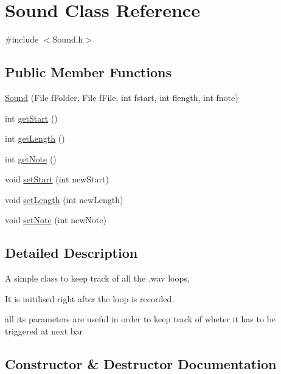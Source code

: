 \hypertarget{class_sound}{}\section{Sound Class Reference}
\label{class_sound}


{\ttfamily \#include $<$Sound.\+h$>$}

\subsection*{Public Member Functions}
\begin{DoxyCompactItemize}
\item 
\mbox{\hyperlink{class_sound_afd2f45e3e3beff9624ae5fb02fbc80bb}{Sound}} (File f\+Folder, File f\+File, int fstart, int flength, int fnote)
\item 
int \mbox{\hyperlink{class_sound_abdc20b1e2d151987ad6958749693a622}{get\+Start}} ()
\item 
int \mbox{\hyperlink{class_sound_a621ec3a749962543eea4d64a789b38b4}{get\+Length}} ()
\item 
int \mbox{\hyperlink{class_sound_a13c91185d1fd706bccb1ee4eb1b36645}{get\+Note}} ()
\item 
void \mbox{\hyperlink{class_sound_a461046367f146bb9e842a3ac36e144a3}{set\+Start}} (int new\+Start)
\item 
void \mbox{\hyperlink{class_sound_a0dd61b160b0424f36f2d858667b52ea2}{set\+Length}} (int new\+Length)
\item 
void \mbox{\hyperlink{class_sound_aa5c37c27281ccf904f211229b1197469}{set\+Note}} (int new\+Note)
\end{DoxyCompactItemize}


\subsection{Detailed Description}
A simple class to keep track of all the .wav loops,

It is initilised right after the loop is recorded.

all its parameters are useful in order to keep track of wheter it has to be triggered at next bar 

\subsection{Constructor \& Destructor Documentation}
\mbox{\label{class_sound_afd2f45e3e3beff9624ae5fb02fbc80bb}} 
